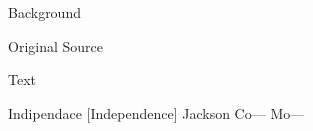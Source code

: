 				\begin{description}
					\item[Background]
				\end{description}
				
				
				\begin{description}
					\item[Original Source]
				\end{description}
				
					
				
				\begin{description}
					\item[Text]
				\end{description}
				
					
					Indipendace [Independence] Jackson Co--- Mo---
					
